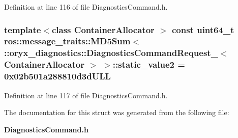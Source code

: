 \-Definition at line 116 of file \-Diagnostics\-Command.\-h.

\subsubsection[{static\-\_\-value2}]{\setlength{\rightskip}{0pt plus 5cm}template$<$class Container\-Allocator $>$ const uint64\-\_\-t ros\-::message\-\_\-traits\-::\-M\-D5\-Sum$<$ \-::{\bf oryx\-\_\-diagnostics\-::\-Diagnostics\-Command\-Request\-\_\-}$<$ \-Container\-Allocator $>$ $>$\-::{\bf static\-\_\-value2} = 0x02b501a288810d3d\-U\-L\-L\hspace{0.3cm}{\ttfamily  [static]}}\label{structros_1_1message__traits_1_1MD5Sum_3_01_1_1oryx__diagnostics_1_1DiagnosticsCommandRequest___00856bcfa6e99e9b67a36df7f96be842_a9ca74366778333cfc5cc75aa60f31861}


\-Definition at line 117 of file \-Diagnostics\-Command.\-h.



\-The documentation for this struct was generated from the following file\-:\begin{DoxyCompactItemize}
\item 
{\bf \-Diagnostics\-Command.\-h}\end{DoxyCompactItemize}
